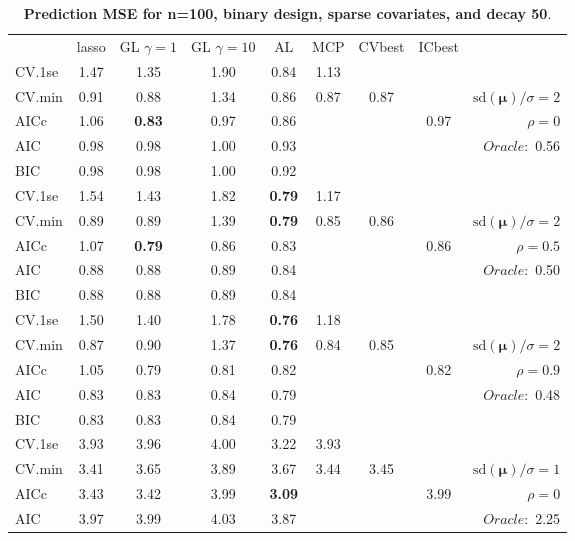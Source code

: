 \clearpage
\begin{table}\vspace{-.5cm}
\caption[l]{ { \bf Prediction MSE for n=100, binary design, 
sparse covariates, and  decay  50}.}
\vspace{-.5cm}
\footnotesize{}
\begin{center}
\begin{tabular}{l*{7}{c}|r}
 & lasso & GL $\gamma=1$ & GL $\gamma=10$ & AL & MCP  & CVbest & ICbest  \\
\cline{1-9}
CV.1se & 1.47 & 1.35 & 1.90 & 0.84 & 1.13 & & & \\
CV.min & 0.91 & 0.88 & 1.34 & 0.86 & 0.87 & 0.87 & & $\mathrm{sd}(\mathbf{\mu})/\sigma=2$ \\
AICc & 1.06 & {\bf 0.83} & 0.97 & 0.86 & & & 0.97 &  $\rho=0$ \\
AIC & 0.98 & 0.98 & 1.00 & 0.93 & & & &  \multirow{2}{*}{$Oracle: $ 0.56} \\
BIC & 0.98 & 0.98 & 1.00 & 0.92 & & & &  \\
 \hline 
CV.1se & 1.54 & 1.43 & 1.82 & {\bf 0.79} & 1.17 & & & \\
CV.min & 0.89 & 0.89 & 1.39 & {\bf 0.79} & 0.85 & 0.86 & & $\mathrm{sd}(\mathbf{\mu})/\sigma=2$ \\
AICc & 1.07 & {\bf 0.79} & 0.86 & 0.83 & & & 0.86 &  $\rho=0.5$ \\
AIC & 0.88 & 0.88 & 0.89 & 0.84 & & & &  \multirow{2}{*}{$Oracle: $ 0.50} \\
BIC & 0.88 & 0.88 & 0.89 & 0.84 & & & &  \\
 \hline 
CV.1se & 1.50 & 1.40 & 1.78 & {\bf 0.76} & 1.18 & & & \\
CV.min & 0.87 & 0.90 & 1.37 & {\bf 0.76} & 0.84 & 0.85 & & $\mathrm{sd}(\mathbf{\mu})/\sigma=2$ \\
AICc & 1.05 & 0.79 & 0.81 & 0.82 & & & 0.82 &  $\rho=0.9$ \\
AIC & 0.83 & 0.83 & 0.84 & 0.79 & & & &  \multirow{2}{*}{$Oracle: $ 0.48} \\
BIC & 0.83 & 0.83 & 0.84 & 0.79 & & & &  \\
 \hline 
CV.1se & 3.93 & 3.96 & 4.00 & 3.22 & 3.93 & & & \\
CV.min & 3.41 & 3.65 & 3.89 & 3.67 & 3.44 & 3.45 & & $\mathrm{sd}(\mathbf{\mu})/\sigma=1$ \\
AICc & 3.43 & 3.42 & 3.99 & {\bf 3.09} & & & 3.99 &  $\rho=0$ \\
AIC & 3.97 & 3.99 & 4.03 & 3.87 & & & &  \multirow{2}{*}{$Oracle: $ 2.25} \\

\end{tabular}
\end{center}
\end{table}
